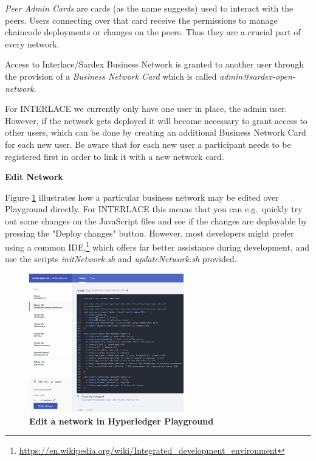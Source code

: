 \textit{Peer Admin Cards} are cards (as the name suggests) used to interact with the peers. Users connecting over that card receive the permissions to manage chaincode deployments or changes on the peers. Thus they are a crucial part of every network.

Access to Interlace/Sardex Business Network is granted to another user through the provision of a \textit{Business Network Card} which is called \textit{admin@sardex-open-network}.

For INTERLACE we currently only have one user in place, the admin user. However, if the network gets deployed it will become necessary to grant access to other users, which can be done by creating an additional Business Network Card for each new user. Be aware that for each new user a participant needs to be registered first in order to link it with a new network card. 

\textbf{Edit Network}

Figure \ref{fig:edit-network} illustrates how a particular business network may be edited over Playground directly. For INTERLACE this means that you can e.g.\ quickly try out some changes on the JavaScript files and see if the changes are deployable by pressing the "Deploy changes" button. However, most developers might prefer using a common IDE,\footnote{\url{https://en.wikipedia.org/wiki/Integrated_development_environment}} which offers far better assistance during development, and use the scripts \textit{initNetwork.sh} and \textit{updateNetwork.sh} provided.

\begin{figure}[htbp]
  \centering
  \includegraphics[width=0.6\textwidth]{Figures/edit-network}
  \caption{\bf\small Edit a network in Hyperledger Playground}
  \label{fig:edit-network}
\end{figure}

